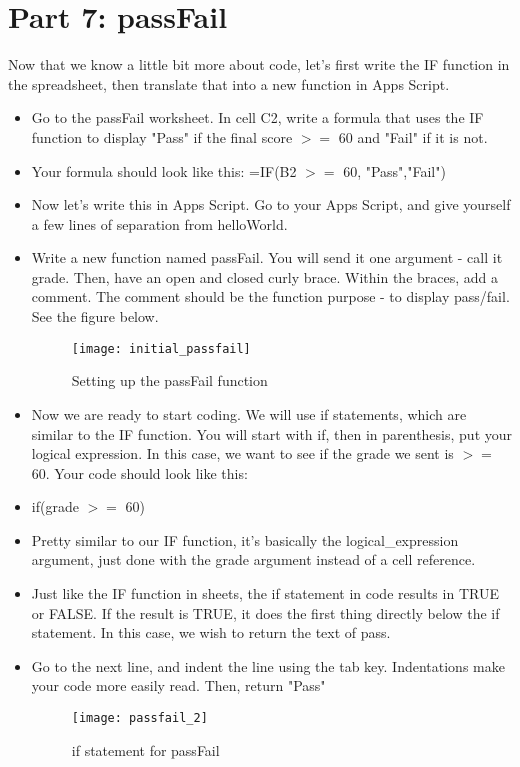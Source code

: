 \documentclass{article}
\begin{document}
\section*{Part 7: passFail}
Now that we know a little bit more about code, let's first write the IF function in the spreadsheet, then translate that into a new function in Apps Script.
\begin{itemize}
	\item Go to the passFail worksheet.  In cell C2, write a formula that uses the IF function to display "Pass" if the final score $>=$ 60 and "Fail" if it is not.
	\item Your formula should look like this:  =IF(B2 $>=$ 60, "Pass","Fail")
	\item Now let's write this in Apps Script.  Go to your Apps Script, and give yourself a few lines of separation from helloWorld.
	\item Write a new function named passFail.  You will send it one argument - call it grade.  Then, have an open and closed curly brace. Within the braces, add a comment.  The comment should be the function purpose - to display pass/fail.  See the figure below.
	 \begin{figure}[H]
  \centering
  \texttt{[image: initial\_passfail]}
  \caption{Setting up the passFail function}
\end{figure}
	\item Now we are ready to start coding.  We will use if statements, which are similar to the IF function.  You will start with if, then in parenthesis, put your logical expression.  In this case, we want to see if the grade we sent is $>=$ 60.  Your code should look like this:
	\item if(grade $>=$ 60)
	\item Pretty similar to our IF function, it's basically the logical\_expression argument, just done with the grade argument instead of a cell reference.
	\item Just like the IF function in sheets, the if statement in code results in TRUE or FALSE.  If the result is TRUE, it does the first thing directly below the if statement.  In this case, we wish to return the text of pass.  
	\item Go to the next line, and indent the line using the tab key.  Indentations make your code more easily read.  Then, return "Pass"
	\begin{figure}[H]
  \centering
  \texttt{[image: passfail\_2]}
  \caption{if statement for passFail} 
\end{figure}

\end{itemize}
\end{document}
